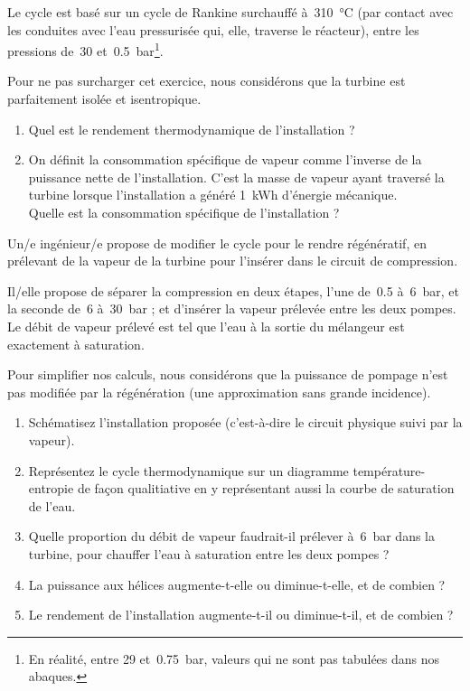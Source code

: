 	Le cycle est basé sur un cycle de Rankine surchauffé à~\SI{310}{\degreeCelsius} (par contact avec les conduites avec l’eau pressurisée qui, elle, traverse le réacteur), entre les pressions de~\num{30} et~\SI{0,5}{\bar}\footnote{En réalité, entre \num{29} et~\SI{0,75}{\bar}, valeurs qui ne sont pas tabulées dans nos abaques.}. 
	
	Pour ne pas surcharger cet exercice, nous considérons que la turbine est parfaitement isolée et isentropique.

	\begin{enumerate}
		\item Quel est le rendement thermodynamique de l’installation ?
		\item On définit la consommation spécifique de vapeur comme l’inverse de la puissance nette de l’installation. C’est la masse de vapeur ayant traversé la turbine lorsque l’installation a généré \SI{1}{\kWh} d’énergie mécanique.\\
			Quelle est la consommation spécifique de l’installation ?
	\end{enumerate}

	Un/e ingénieur/e propose de modifier le cycle pour le rendre régénératif, en prélevant de la vapeur de la turbine pour l’insérer dans le circuit de compression.
	
	Il/elle propose de séparer la compression en deux étapes, l’une de~\num{0,5} à~\SI{6}{\bar}, et la seconde de~\num{6} à~\SI{30}{\bar} ; et d’insérer la vapeur prélevée entre les deux pompes. Le débit de vapeur prélevé est tel que l’eau à la sortie du mélangeur est exactement à saturation.
	
	Pour simplifier nos calculs, nous considérons que la puissance de pompage n’est pas modifiée par la régénération (une approximation sans grande incidence).
	
	\begin{enumerate}	
		\item Schématisez l’installation proposée (c’est-à-dire le circuit physique suivi par la vapeur).
		\item Représentez le cycle thermodynamique sur un diagramme température-entropie de façon qualitiative en y représentant aussi la courbe de saturation de l’eau.
		\item Quelle proportion du débit de vapeur faudrait-il prélever à~\SI{6}{\bar} dans la turbine, pour chauffer l’eau à saturation entre les deux pompes ?
		\item La puissance aux hélices augmente-t-elle ou diminue-t-elle, et de combien ?
		\item Le rendement de l’installation augmente-t-il ou diminue-t-il, et de combien ?
	\end{enumerate}

